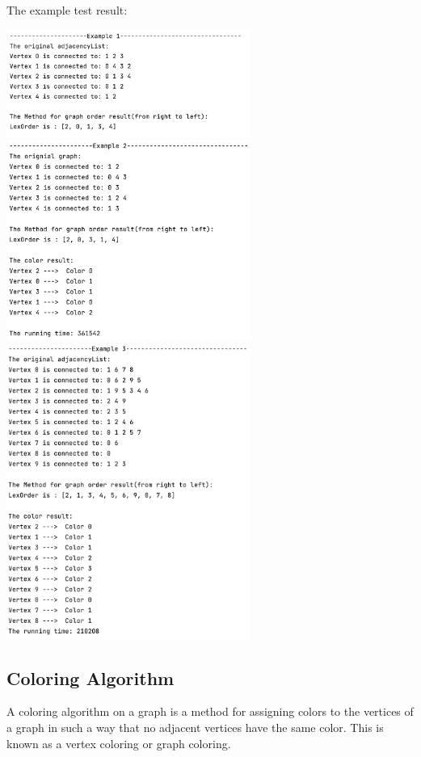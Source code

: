 \documentclass{article}
\begin{document}
\begin{enumerate}
\begin{verbatim}
    \end{verbatim}
        The example test result:
        \begin{center}
        \includegraphics[width=0.6\textwidth]{p6.png}
        \includegraphics[width=0.6\textwidth]{p7.png}
        \includegraphics[width=0.6\textwidth]{p8.png}
    \end{center}

    




\end{enumerate}

\subsection{Coloring Algorithm}
A coloring algorithm on a graph is a method for assigning colors to the vertices of a graph in such a way that no adjacent vertices have the same color. This is known as a vertex coloring or graph coloring. 
\end{document}
